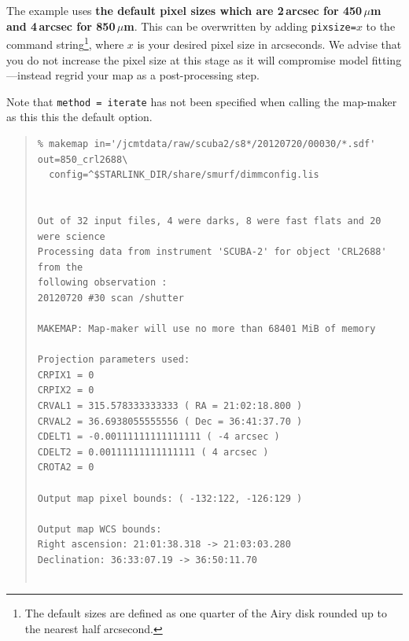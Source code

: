 \documentclass[twoside,11pt]{article}
\renewcommand{\_}{\texttt{\symbol{95}}}
\newenvironment{myquote}{\begin{quote}\begin{small}}{\end{small}\end{quote}}
\begin{document}
The example uses \textbf{the
default pixel sizes which are 2\,arcsec for 450\,$\mu$m and 4\,arcsec for
850\,$\mu$m}. This can be overwritten by adding \texttt{pixsize=}$x$ to the
command string\footnote{The default sizes are defined as one quarter
of the Airy disk rounded up to the nearest half arcsecond.}, where $x$
is your desired pixel size in arcseconds. We advise that you do not
increase the pixel size at this stage as it will compromise model
fitting---instead regrid your map as a post-processing step.

Note that \texttt{method = iterate} has not been specified when
calling the map-maker as this this the default option.

\begin{myquote}
\begin{verbatim}
% makemap in='/jcmtdata/raw/scuba2/s8*/20120720/00030/*.sdf' out=850_crl2688\
  config=^$STARLINK_DIR/share/smurf/dimmconfig.lis 


Out of 32 input files, 4 were darks, 8 were fast flats and 20 were science
Processing data from instrument 'SCUBA-2' for object 'CRL2688' from the
following observation :
20120720 #30 scan /shutter

MAKEMAP: Map-maker will use no more than 68401 MiB of memory

Projection parameters used:
CRPIX1 = 0
CRPIX2 = 0
CRVAL1 = 315.578333333333 ( RA = 21:02:18.800 )
CRVAL2 = 36.6938055555556 ( Dec = 36:41:37.70 )
CDELT1 = -0.00111111111111111 ( -4 arcsec )
CDELT2 = 0.00111111111111111 ( 4 arcsec )
CROTA2 = 0

Output map pixel bounds: ( -132:122, -126:129 )

Output map WCS bounds:
Right ascension: 21:01:38.318 -> 21:03:03.280
Declination: 36:33:07.19 -> 36:50:11.70


\end{verbatim}
\end{myquote}
\end{document}

